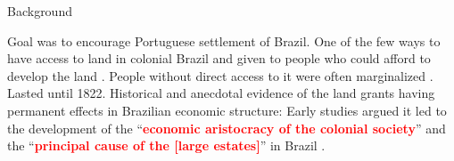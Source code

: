 \documentclass[aspectratio=1610]{beamer}
\begin{document}
\begin{frame}{Background}
    \begin{outline}
        \1 Goal was to encourage Portuguese settlement of Brazil.
        \vspace{2mm}
        \1 One of the few ways to have access to land in colonial Brazil and given to people who could afford to develop the land \parencites{Smith1944-oi}{Dean1971-iq}.
        \vspace{-1mm}
        \1 People without direct access to it were often marginalized \parencite{Simonsen2005-ps}.
        \vspace{2mm}
        \1 Lasted until 1822.
        \vspace{2mm}
        \1 Historical and anecdotal evidence of the land grants having permanent effects in Brazilian economic structure:
        \vspace{2mm}
            \2 Early studies argued it led to the development of the ``\textcolor{red}{\textbf{economic aristocracy of the colonial society}}'' and the ``\textcolor{red}{\textbf{principal cause of the [large estates]}}'' in Brazil \parencites[p.~36]{Lima2002-kd}[p.~48]{Da_Costa_Porto1979-dz}.
    \end{outline}    
\end{frame}


\end{document}
